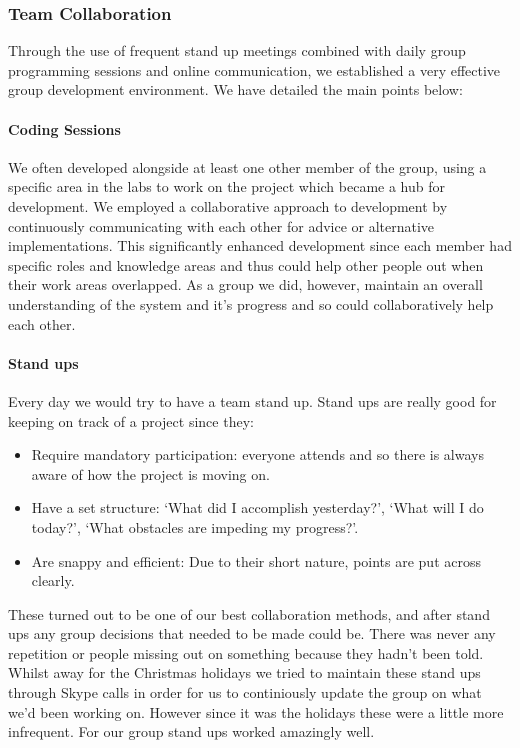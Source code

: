   \subsubsection{Team Collaboration}

    Through the use of frequent stand up meetings combined with daily group programming sessions and online communication, we established a very effective group development environment. We have detailed the main points below:

    \paragraph{Coding Sessions} We often developed alongside at least one other member of the group, using a specific area in the labs to work on the project which became a hub for development. We employed a collaborative approach to development by continuously communicating with each other for advice or alternative implementations. This significantly enhanced development since each member had specific roles and knowledge areas and thus could help other people out when their work areas overlapped. As a group we did, however, maintain an overall understanding of the system and it's progress and so could collaboratively help each other.

    \paragraph{Stand ups} Every day we would try to have a team stand up. Stand ups are really good for keeping on track of a project since they:
    \begin{itemize}
        \item Require mandatory participation: everyone attends and so there is always aware of how the project is moving on.
        \item Have a set structure: `What did I accomplish yesterday?', `What will I do today?', `What obstacles are impeding my progress?'.
        \item Are snappy and efficient: Due to their short nature, points are put across clearly.
    \end{itemize}
    These turned out to be one of our best collaboration methods, and after stand ups any group decisions that needed to be made could be. There was never any repetition or people missing out on something because they hadn't been told.
    Whilst away for the Christmas holidays we tried to maintain these stand ups through Skype\cite{skype} calls in order for us to continiously update the group on what we'd been working on. However since it was the holidays these were a little more infrequent.
    For our group stand ups worked amazingly well.

